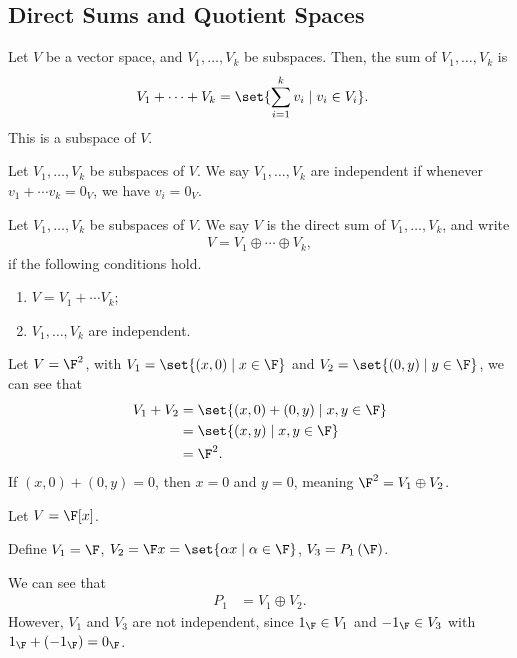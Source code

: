 \documentclass[10pt]{mypackage}
\begin{document}
\subsection{Direct Sums and Quotient Spaces}%
\begin{definition}
  Let $V$ be a vector space, and $V_1,\dots,V_k$ be subspaces. Then, the sum of $V_1,\dots,V_k$ is
  \begin{align*}
    V_1 + \cdots + V_k &= \set{\sum_{i=1}^{k}v_i\mid v_i\in V_i}.
  \end{align*}
  This is a subspace of $V$.
\end{definition}
\begin{definition}
  Let $V_1,\dots,V_k$ be subspaces of $V$. We say $V_1,\dots,V_k$ are independent if whenever $v_1 + \cdots v_k = 0_V$, we have $v_i = 0_V$.
\end{definition}
\begin{definition}
  Let $V_1,\dots,V_k$ be subspaces of $V$. We say $V$ is the direct sum of $V_1,\dots,V_k$, and write
  \begin{align*}
    V = V_1 \oplus \cdots \oplus V_k,
  \end{align*}
  if the following conditions hold.
  \begin{enumerate}[(1)]
    \item $V = V_1 + \cdots V_k$;
    \item $V_1,\dots,V_k$ are independent.
  \end{enumerate}
\end{definition}
\begin{example}
  Let $V = \F^2$, with $V_1 = \set{\left(x,0\right)\mid x\in \F}$ and $V_2 = \set{\left(0,y\right)\mid y\in \F}$, we can see that
  \begin{align*}
    V_1 + V_2 &= \set{\left(x,0\right) + \left(0,y\right)\mid x,y\in \F}\\
              &= \set{\left(x,y\right)\mid x,y\in \F}\\
              &= \F^2.
  \end{align*}
  If $\left(x,0\right) + \left(0,y\right) = 0$, then $x = 0$ and $y = 0$, meaning $\F^2 = V_1\oplus V_2$.
\end{example}
\begin{example}
  Let $V = \F[x]$.\newline

  Define $V_1 = \F$, $V_2 = \F x = \set{\alpha x\mid \alpha \in \F}$, $V_3 = P_1\left(\F\right)$.\newline

  We can see that
  \begin{align*}
    P_1 &= V_1\oplus V_2.
  \end{align*}
  However, $V_1$ and $V_3$ are not independent, since $1_{\F}\in V_1$ and $-1_{\F}\in V_3$ with $1_{\F} + \left(-1_{\F}\right) = 0_\F$.
\end{example}
\end{document}
